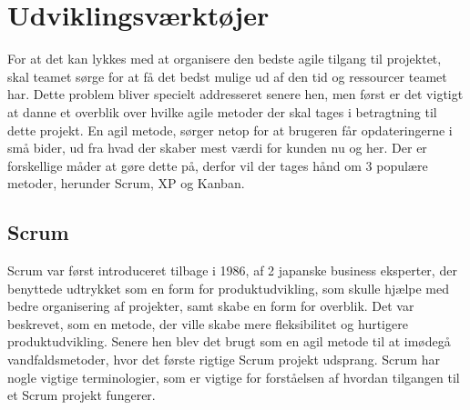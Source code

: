 
\chapter{Udviklingsværktøjer}\label{ch:udviklingsv}

For at det kan lykkes med at organisere den bedste agile tilgang til projektet, skal teamet sørge for at få det bedst mulige ud af den tid og ressourcer teamet har. Dette problem bliver specielt addresseret senere hen, men først er det vigtigt at danne et overblik over hvilke agile metoder der skal tages i betragtning til dette projekt. En agil metode, sørger netop for at brugeren får opdateringerne i små bider, ud fra hvad der skaber mest værdi for kunden nu og her. Der er forskellige måder at gøre dette på, derfor vil der tages hånd om 3 populære metoder, herunder Scrum, XP og Kanban. 

\section{Scrum}

Scrum var først introduceret tilbage i 1986, af 2 japanske business eksperter, der benyttede udtrykket som en form for produktudvikling, som skulle hjælpe med bedre organisering af projekter, samt skabe en form for overblik. Det var beskrevet, som en metode, der ville skabe mere fleksibilitet og hurtigere produktudvikling. Senere hen blev det brugt som en agil metode til at imødegå vandfaldsmetoder, hvor det første rigtige Scrum projekt udsprang\cite{ScrumHistory}. Scrum har nogle vigtige terminologier, som er vigtige for forståelsen af hvordan tilgangen til et Scrum projekt fungerer. 

